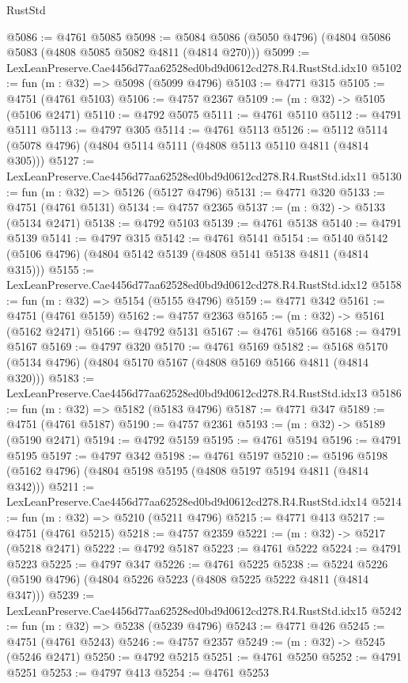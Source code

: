 \begin{lexlean}{RustStd}
\begin{coremodule}
@5086 := @4761 @5085
@5098 := @5084 @5086 (@5050 @4796) (@4804 @5086 @5083 (@4808 @5085 @5082 @4811 (@4814 @270)))
@5099 := LexLeanPreserve.Cae4456d77aa62528ed0bd9d0612cd278.R4.RustStd.idx10
@5102 := fun (m : @32) => @5098 (@5099 @4796)
@5103 := @4771 @315
@5105 := @4751 (@4761 @5103)
@5106 := @4757 @2367
@5109 := (m : @32) -> @5105 (@5106 @2471)
@5110 := @4792 @5075
@5111 := @4761 @5110
@5112 := @4791 @5111
@5113 := @4797 @305
@5114 := @4761 @5113
@5126 := @5112 @5114 (@5078 @4796) (@4804 @5114 @5111 (@4808 @5113 @5110 @4811 (@4814 @305)))
@5127 := LexLeanPreserve.Cae4456d77aa62528ed0bd9d0612cd278.R4.RustStd.idx11
@5130 := fun (m : @32) => @5126 (@5127 @4796)
@5131 := @4771 @320
@5133 := @4751 (@4761 @5131)
@5134 := @4757 @2365
@5137 := (m : @32) -> @5133 (@5134 @2471)
@5138 := @4792 @5103
@5139 := @4761 @5138
@5140 := @4791 @5139
@5141 := @4797 @315
@5142 := @4761 @5141
@5154 := @5140 @5142 (@5106 @4796) (@4804 @5142 @5139 (@4808 @5141 @5138 @4811 (@4814 @315)))
@5155 := LexLeanPreserve.Cae4456d77aa62528ed0bd9d0612cd278.R4.RustStd.idx12
@5158 := fun (m : @32) => @5154 (@5155 @4796)
@5159 := @4771 @342
@5161 := @4751 (@4761 @5159)
@5162 := @4757 @2363
@5165 := (m : @32) -> @5161 (@5162 @2471)
@5166 := @4792 @5131
@5167 := @4761 @5166
@5168 := @4791 @5167
@5169 := @4797 @320
@5170 := @4761 @5169
@5182 := @5168 @5170 (@5134 @4796) (@4804 @5170 @5167 (@4808 @5169 @5166 @4811 (@4814 @320)))
@5183 := LexLeanPreserve.Cae4456d77aa62528ed0bd9d0612cd278.R4.RustStd.idx13
@5186 := fun (m : @32) => @5182 (@5183 @4796)
@5187 := @4771 @347
@5189 := @4751 (@4761 @5187)
@5190 := @4757 @2361
@5193 := (m : @32) -> @5189 (@5190 @2471)
@5194 := @4792 @5159
@5195 := @4761 @5194
@5196 := @4791 @5195
@5197 := @4797 @342
@5198 := @4761 @5197
@5210 := @5196 @5198 (@5162 @4796) (@4804 @5198 @5195 (@4808 @5197 @5194 @4811 (@4814 @342)))
@5211 := LexLeanPreserve.Cae4456d77aa62528ed0bd9d0612cd278.R4.RustStd.idx14
@5214 := fun (m : @32) => @5210 (@5211 @4796)
@5215 := @4771 @413
@5217 := @4751 (@4761 @5215)
@5218 := @4757 @2359
@5221 := (m : @32) -> @5217 (@5218 @2471)
@5222 := @4792 @5187
@5223 := @4761 @5222
@5224 := @4791 @5223
@5225 := @4797 @347
@5226 := @4761 @5225
@5238 := @5224 @5226 (@5190 @4796) (@4804 @5226 @5223 (@4808 @5225 @5222 @4811 (@4814 @347)))
@5239 := LexLeanPreserve.Cae4456d77aa62528ed0bd9d0612cd278.R4.RustStd.idx15
@5242 := fun (m : @32) => @5238 (@5239 @4796)
@5243 := @4771 @426
@5245 := @4751 (@4761 @5243)
@5246 := @4757 @2357
@5249 := (m : @32) -> @5245 (@5246 @2471)
@5250 := @4792 @5215
@5251 := @4761 @5250
@5252 := @4791 @5251
@5253 := @4797 @413
@5254 := @4761 @5253

\end{coremodule}
\end{lexlean}
